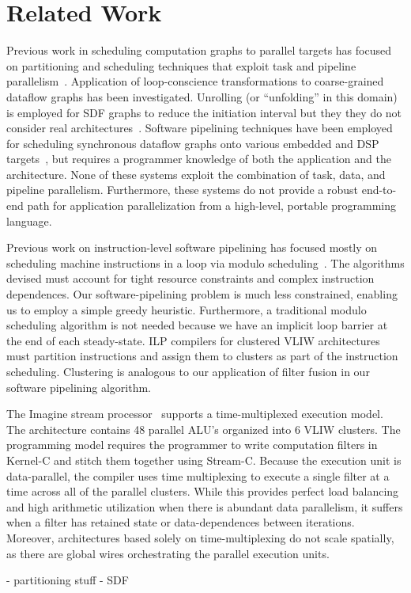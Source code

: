 \section{Related Work}
\label{sec:related}

Previous work in scheduling computation graphs to parallel targets has
focused on partitioning and scheduling techniques that exploit task
and pipeline parallelism~\cite{SDFSched, SDFSched2,
may87communicating, DAGSched, pipeline-sdf}.  Application of
loop-conscience transformations to coarse-grained dataflow graphs has
been investigated.  Unrolling (or ``unfolding'' in this domain) is
employed for SDF graphs to reduce the initiation interval but they
they do not consider real
architectures~\cite{unfolding,unfolding2}. Software pipelining
techniques have been employed for scheduling synchronous dataflow
graphs onto various embedded and DSP
targets~\cite{bakshi99,chatha-02}, but requires a programmer knowledge
of both the application and the architecture. None of these systems
exploit the combination of task, data, and pipeline parallelism.
Furthermore, these systems do not provide a robust end-to-end path for
application parallelization from a high-level, portable programming
language.

Previous work on instruction-level software pipelining has focused
mostly on scheduling machine instructions in a loop via modulo
scheduling~\cite{rau81, lam-softpipe}.  The algorithms devised must
account for tight resource constraints and complex instruction
dependences. Our software-pipelining problem is much less constrained,
enabling us to employ a simple greedy heuristic.  Furthermore, a
traditional modulo scheduling algorithm is not needed because we have
an implicit loop barrier at the end of each steady-state.  ILP
compilers for clustered VLIW architectures~\cite{Bulldog, Multiflow,
lee98spacetime, qian02} must partition instructions and assign them to
clusters as part of the instruction scheduling. Clustering is
analogous to our application of filter fusion in our software
pipelining algorithm. 




The Imagine stream processor~\cite{rixner98bandwidthefficient}
supports a time-multiplexed execution model.  The architecture
contains 48 parallel ALU's organized into 6 VLIW clusters.  The
programming model requires the programmer to write computation filters
in Kernel-C and stitch them together using Stream-C.  Because the
execution unit is data-parallel, the compiler uses time multiplexing
to execute a single filter at a time across all of the parallel
clusters.  While this provides perfect load balancing and high
arithmetic utilization when there is abundant data parallelism, it
suffers when a filter has retained state or data-dependences between
iterations.  Moreover, architectures based solely on time-multiplexing
do not scale spatially, as there are global wires orchestrating the
parallel execution units.

- partitioning stuff
- SDF
